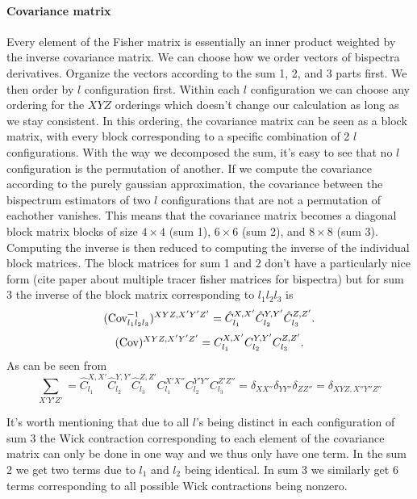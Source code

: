 \documentclass[11pt]{article} %
\DeclareRobustCommand{\Cov}{\ifmmode\text{Cov}\else d\fi}
\begin{document}
\paragraph{Covariance matrix}
Every element of the Fisher matrix is essentially an inner product weighted by the inverse covariance matrix. We can choose how we order vectors of bispectra derivatives. Organize the vectors according to the sum 1, 2, and 3 parts first. We then order by $l$ configuration first. Within each $l$ configuration we can choose any ordering for the $XYZ$ orderings which doesn't change our calculation as long as we stay consistent. In this ordering, the covariance matrix can be seen as a block matrix, with every block corresponding to a specific combination of 2 $l$ configurations. With the way we decomposed the sum, it's easy to see that no $l$ configuration is the permutation of another. If we compute the covariance according to the purely gaussian approximation, the covariance between the bispectrum estimators of two $l$ configurations that are not a permutation of eachother vanishes. This means that the covariance matrix becomes a diagonal block matrix blocks of size $4 \times 4$ (sum 1), $6 \times 6$ (sum 2), and $8 \times 8$ (sum 3). Computing the inverse is then reduced to computing the inverse of the individual block matrices. The block matrices for sum 1 and 2 don't have a particularly nice form (cite paper about multiple tracer fisher matrices for bispectra) but for sum 3 the inverse of the block matrix corresponding to $l_1l_2l_3$ is
\begin{equation*}
    (\Cov_{l_1l_2l_3}^{-1})^{XYZ, X'Y'Z'} = \hat C_{l_1}^{X,X'}\hat C_{l_2}^{Y,Y'}\hat C_{l_3}^{Z,Z'}.
\end{equation*}
\begin{equation*}
    (\Cov)^{XYZ, X'Y'Z'} = C_{l_1}^{X,X'} C_{l_2}^{Y,Y'} C_{l_3}^{Z,Z'}.
\end{equation*}
As can be seen from
\begin{equation*}
    \sum_{X'Y'Z'} = \hat C_{l_1}^{X,X'}\hat C_{l_2}^{Y,Y'}\hat C_{l_3}^{Z,Z'} C_{l_1}^{X'X''}C_{l_2}^{Y'Y''}C_{l_3}^{Z'Z''} = \delta_{XX''}\delta_{YY''}\delta_{ZZ''} = \delta_{XYZ, X''Y''Z''}
\end{equation*}

It's worth mentioning that due to all $l$'s being distinct in each configuration of sum 3 the Wick contraction corresponding to each element of the covariance matrix can only be done in one way and we thus only have one term. In the sum 2 we get two terms due to $l_1$ and $l_2$ being identical. In sum 3 we similarly get 6 terms corresponding to all possible Wick contractions being nonzero.
\end{document}
